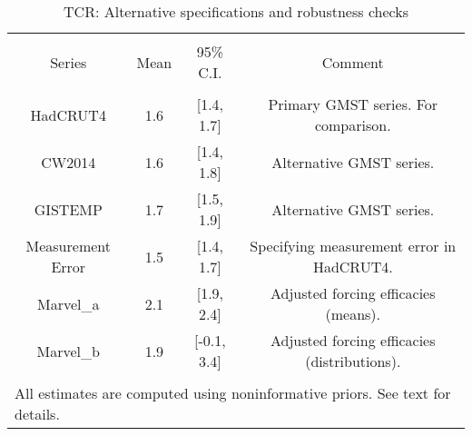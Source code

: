 
\begin{table}[!htbp] \centering 
  \caption{TCR: Alternative specifications and robustness checks} 
  \label{tab:tcr-robust} 
\begin{tabular}{@{\extracolsep{5pt}} cccc} 
\\[-1.8ex]\hline 
\hline \\[-1.8ex] 
Series & Mean & 95\% C.I. & Comment \\ 
\hline \\[-1.8ex] 
HadCRUT4 & 1.6 & [1.4, 1.7] & Primary GMST series. For comparison. \\ 
CW2014 & 1.6 & [1.4, 1.8] & Alternative GMST series. \\ 
GISTEMP & 1.7 & [1.5, 1.9] & Alternative GMST series. \\ 
Measurement Error & 1.5 & [1.4, 1.7] & Specifying measurement error in HadCRUT4. \\ 
Marvel\_a & 2.1 & [1.9, 2.4] & Adjusted forcing efficacies (means). \\ 
Marvel\_b & 1.9 & [-0.1, 3.4] & Adjusted forcing efficacies (distributions). \\ 
\hline \\[-1.8ex] 
\multicolumn{4}{l}{\footnotesize All estimates are computed using noninformative priors. See text for details.} \\ 
\end{tabular} 
\end{table} 
